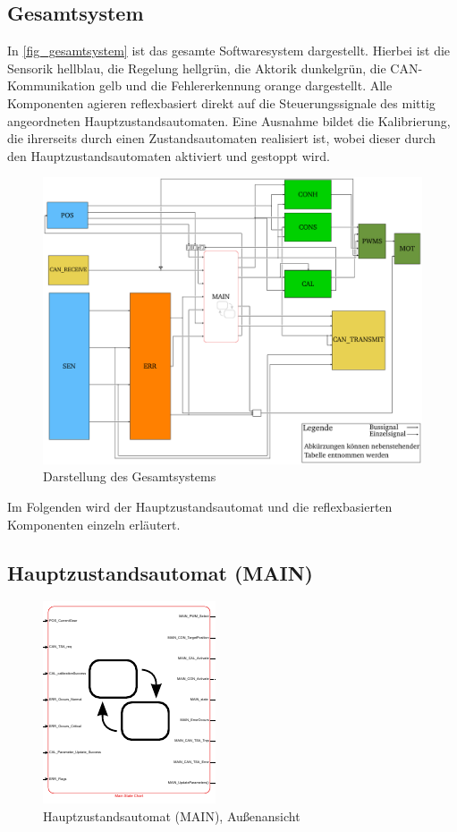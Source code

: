 \subsection{Gesamtsystem}
In \autoref{fig_gesamtsystem} ist das gesamte Softwaresystem dargestellt. Hierbei ist die Sensorik hellblau, die Regelung hellgrün, die Aktorik dunkelgrün, die CAN-Kommunikation gelb und die Fehlererkennung orange dargestellt. Alle Komponenten agieren reflexbasiert direkt auf die Steuerungssignale des mittig angeordneten Hauptzustandsautomaten. Eine Ausnahme bildet die Kalibrierung, die ihrerseits durch einen Zustandsautomaten realisiert ist, wobei dieser durch den Hauptzustandsautomaten aktiviert und gestoppt wird. 
\begin{figure}[H]%
\centering
\includegraphics[width=0.9\columnwidth]{./Bilder/fig_gesamtsystem}%
\caption{Darstellung des Gesamtsystems}%
\label{fig_gesamtsystem}%
\end{figure}
Im Folgenden wird der Hauptzustandsautomat und die reflexbasierten Komponenten einzeln erläutert.

\subsection{Hauptzustandsautomat (MAIN)}

\begin{figure}[H]%
\centering
\includegraphics[width=0.6\columnwidth]{./Bilder/fig_main}%
\caption{Hauptzustandsautomat (MAIN), Außenansicht}%
\label{fig_main}%
\end{figure}

